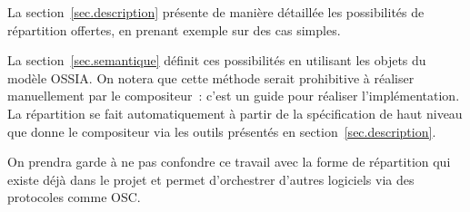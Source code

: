 \documentclass[10pt]{article}
\newcommand\ossia{OSSIA\xspace}
\begin{document}
La section~\ref{sec.description} présente de manière détaillée les possibilités 
de répartition offertes, en prenant exemple sur des cas simples.

La section~\ref{sec.semantique} définit ces possibilités en utilisant les objets du modèle \ossia. 
On notera que cette méthode serait prohibitive à réaliser manuellement par le compositeur~: c'est un guide pour réaliser l'implémentation. 
La répartition se fait automatiquement à partir de la spécification de haut niveau que donne le compositeur via les outils présentés en section~\ref{sec.description}. 

On prendra garde à ne pas confondre ce travail avec la forme de répartition qui existe déjà dans le projet et permet d'orchestrer d'autres logiciels via des protocoles comme OSC.








\end{document}
